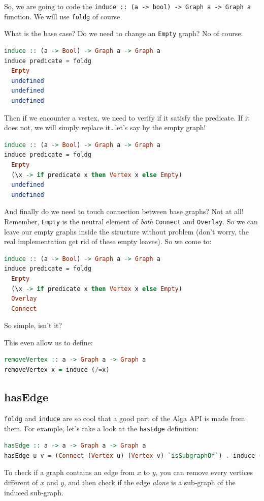 \documentclass[10pt,a4paper]{article}
\begin{document}
So, we are going to code the \verb|induce :: (a -> bool) -> Graph a -> Graph a| function. We will use \verb|foldg| of course

What is the base case? Do we need to change an \verb|Empty| graph? No of course:

\begin{lstlisting}[language=Haskell, frame=single]
induce :: (a -> Bool) -> Graph a -> Graph a
induce predicate = foldg
  Empty 
  undefined
  undefined
  undefined
\end{lstlisting}

Then if we encounter a vertex, we need to verify if it satisfy the predicate. If it does not, we will simply replace it\ldots let's say by the empty graph!

\begin{lstlisting}[language=Haskell, frame=single]
induce :: (a -> Bool) -> Graph a -> Graph a
induce predicate = foldg 
  Empty
  (\x -> if predicate x then Vertex x else Empty)
  undefined
  undefined
\end{lstlisting}
 
And finally do we need to touch connection between base graphs? Not at all! Remember, \verb|Empty| is the neutral element of \emph{both} \verb|Connect| and \verb|Overlay|. So we can leave our empty graphs inside the structure without problem (don't worry, the real implementation get rid of these empty leaves). So we come to:

\begin{lstlisting}[language=Haskell, frame=single]
induce :: (a -> Bool) -> Graph a -> Graph a
induce predicate = foldg 
  Empty 
  (\x -> if predicate x then Vertex x else Empty)
  Overlay
  Connect
\end{lstlisting}

So simple, isn't it?
 
This even allow us to define:

\begin{lstlisting}[language=Haskell, frame=single]
removeVertex :: a -> Graph a -> Graph a
removeVertex x = induce (/=x)
\end{lstlisting}

\subsection{hasEdge}
\verb|foldg| and \verb|induce| are so cool that a good part of the Alga API is made from them. For example, let's take a look at the \verb|hasEdge| definition:
\begin{lstlisting}[language=Haskell, frame=single]
hasEdge :: a -> a -> Graph a -> Graph a
hasEdge u v = (Connect (Vertex u) (Vertex v) `isSubgraphOf`) . induce (`elem` [u, v])
\end{lstlisting}
To check if a graph contains an edge from $x$ to $y$, you can remove every vertices different of $x$ and $y$, and then check if the edge \emph{alone} is a sub-graph of the induced sub-graph.
\end{document}
